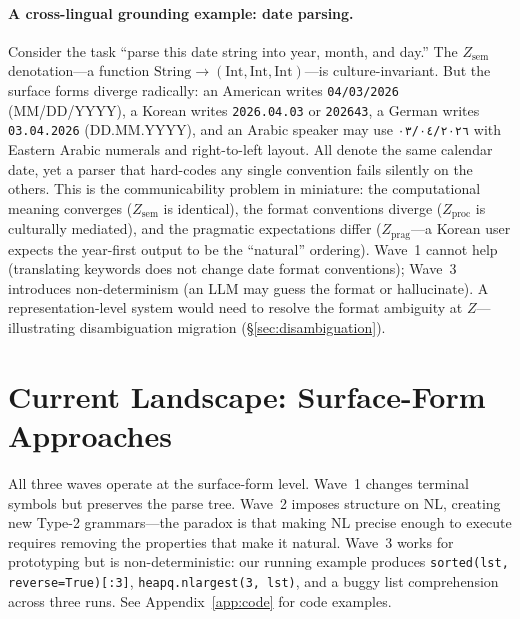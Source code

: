 \documentclass[11pt]{article}
\theoremstyle{definition}
\newcommand{\Zsem}{Z_{\text{sem}}}
\newcommand{\Zproc}{Z_{\text{proc}}}
\newcommand{\Zprag}{Z_{\text{prag}}}
\begin{document}
\paragraph{A cross-lingual grounding example: date parsing.}
Consider the task ``parse this date string into year, month, and day.'' The $\Zsem$ denotation---a function $\text{String} \to (\text{Int}, \text{Int}, \text{Int})$---is culture-invariant. But the surface forms diverge radically: an American writes \texttt{04/03/2026} (MM/DD/YYYY), a Korean writes \texttt{2026.04.03} or \texttt{202643}, a German writes \texttt{03.04.2026} (DD.MM.YYYY), and an Arabic speaker may use \texttt{٠٣/٠٤/٢٠٢٦} with Eastern Arabic numerals and right-to-left layout. All denote the same calendar date, yet a parser that hard-codes any single convention fails silently on the others. This is the communicability problem in miniature: the computational meaning converges ($\Zsem$ is identical), the format conventions diverge ($\Zproc$ is culturally mediated), and the pragmatic expectations differ ($\Zprag$---a Korean user expects the year-first output to be the ``natural'' ordering). Wave~1 cannot help (translating keywords does not change date format conventions); Wave~3 introduces non-determinism (an LLM may guess the format or hallucinate). A representation-level system would need to resolve the format ambiguity at $Z$---illustrating disambiguation migration (\S\ref{sec:disambiguation}).


\section{Current Landscape: Surface-Form Approaches}\label{sec:landscape}

All three waves operate at the surface-form level. Wave~1 changes terminal symbols but preserves the parse tree. Wave~2 imposes structure on NL, creating new Type-2 grammars---the paradox is that making NL precise enough to execute requires removing the properties that make it natural. Wave~3 works for prototyping but is non-deterministic: our running example produces \texttt{sorted(lst, reverse=True)[:3]}, \texttt{heapq.nlargest(3, lst)}, and a buggy list comprehension across three runs. See Appendix~\ref{app:code} for code examples.
\end{document}
